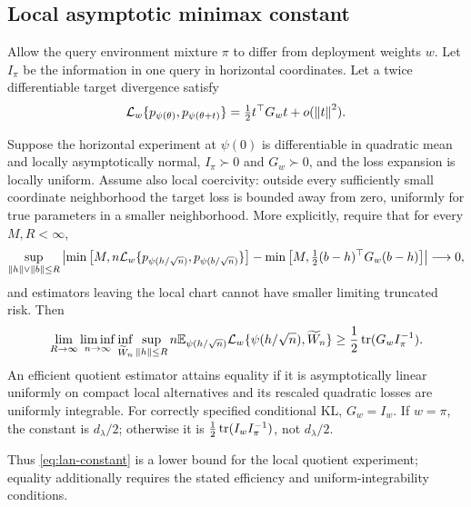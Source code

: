 \subsection{Local asymptotic minimax constant}

Allow the query environment mixture \(\pi\) to differ from deployment weights \(w\). Let \(I_\pi\) be the information in one query in horizontal coordinates. Let a twice differentiable target divergence satisfy
\[
\mathcal L_w\{p_{\psi(\theta)},p_{\psi(\theta+t)}\}
=\tfrac12t^\top G_wt+o(\left\lVert t\right\rVert^2).
\]

\begin{theorem}
\label{thm:lan}
Suppose the horizontal experiment at \(\psi(0)\) is differentiable in
quadratic mean and locally asymptotically normal, \(I_\pi\succ0\) and
\(G_w\succ0\), and the loss expansion is locally uniform.  Assume also local
coercivity: outside every sufficiently small coordinate neighborhood the
target loss is bounded away from zero, uniformly for true parameters in a
smaller neighborhood.  More explicitly, require that for every
\(M,R<\infty\),
\[
\sup_{\left\lVert h\right\rVert\vee\left\lVert b\right\rVert\le R}
\left|\min\left[M,n\mathcal L_w
 \{p_{\psi(h/\sqrt n)},p_{\psi(b/\sqrt n)}\}\right]
-\min\left[M,\tfrac12(b-h)^\top G_w(b-h)\right]\right|
\longrightarrow0,
\]
and estimators leaving the local chart cannot have smaller limiting truncated
risk.  Then
\begin{equation}
\lim_{R\to\infty}\liminf_{n\to\infty}
\inf_{\widetilde W_n}\sup_{\left\lVert h\right\rVert\le R}
n\mathbb E_{\psi(h/\sqrt n)}
\mathcal L_w\{\psi(h/\sqrt n),\widetilde W_n\}
\ge\frac12\operatorname{tr}(G_wI_\pi^{-1}).
\label{eq:lan-constant}
\end{equation}
An efficient quotient estimator attains equality if it is asymptotically
linear uniformly on compact local alternatives and its rescaled quadratic
losses are uniformly integrable. For correctly specified conditional KL,
\(G_w=I_w\). If \(w=\pi\), the constant is \(d_\lambda/2\); otherwise it is
\(\tfrac12\operatorname{tr}(I_wI_\pi^{-1})\), not \(d_\lambda/2\).
\end{theorem}

Thus \cref{eq:lan-constant} is a lower bound for the local quotient experiment;
equality additionally requires the stated efficiency and uniform-integrability
conditions.

